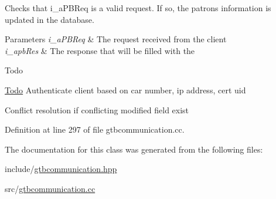 Checks that i\-\_\-a\-P\-B\-Req is a valid request. If so, the patrons information is updated in the database.


\begin{DoxyParams}{Parameters}
{\em i\-\_\-a\-P\-B\-Req} & The request received from the client \\
\hline
{\em i\-\_\-apb\-Res} & The response that will be filled with the \\
\hline
\end{DoxyParams}
\begin{DoxyRefDesc}{Todo}
\item[\hyperlink{todo__todo000003}{Todo}]Authenticate client based on car number, ip address, cert uid 

Conflict resolution if conflicting modified field exist \end{DoxyRefDesc}


Definition at line 297 of file gtbcommunication.\-cc.



The documentation for this class was generated from the following files\-:\begin{DoxyCompactItemize}
\item 
include/\hyperlink{gtbcommunication_8hpp}{gtbcommunication.\-hpp}\item 
src/\hyperlink{gtbcommunication_8cc}{gtbcommunication.\-cc}\end{DoxyCompactItemize}

